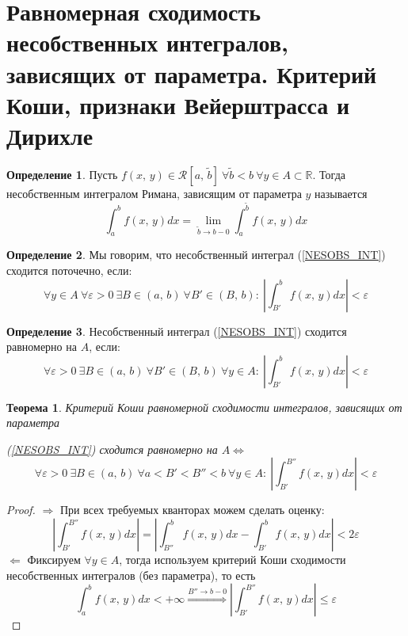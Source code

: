 \documentclass[a4paper,12pt]{article}
\renewcommand{\leq}{\ensuremath{\leqslant}}
\theoremstyle{plain}
\newtheorem{theorem}{Теорема}[section]
\theoremstyle{definition}
\newtheorem{definition}{Определение}[section]
\theoremstyle{remark}
\begin{document}
\section{Равномерная сходимость несобственных интегралов, зависящих от параметра. Критерий Коши, признаки Вейерштрасса и Дирихле}
\begin{definition}
	Пусть $f(x,\,y) \in \mathcal{R}[a,\,\tilde{b}] \: \forall \tilde{b} < b \: \forall y \in A \subset \mathbb{R}$. Тогда несобственным интегралом Римана, зависящим от параметра $y$ называется
	\begin{equation} \label{NESOBS_INT}
		\int_a^b f(x,\,y)dx = \lim_{\tilde{b} \to b - 0} \int_a^{\tilde{b}}f(x,\,y)dx
	\end{equation}
\end{definition}

\begin{definition}
	Мы говорим, что несобственный интеграл (\ref{NESOBS_INT}) сходится поточечно, если:
	\[\forall y \in A \: \forall \varepsilon > 0 \: \exists B \in (a,\,b) \: \forall B' \in (B,\,b):\: \left|\int_{B'}^b f(x,\,y)dx\right| < \varepsilon\]
\end{definition}

\begin{definition}
	Несобственный интеграл (\ref{NESOBS_INT}) сходится равномерно на $A$, если:
	\[\forall \varepsilon > 0 \: \exists B \in (a,\,b) \: \forall B' \in (B,\,b) \: \forall y \in A :\: \left|\int_{B'}^b f(x,\,y)dx\right| < \varepsilon\]
\end{definition}

\begin{theorem}
	Критерий Коши равномерной сходимости интегралов, зависящих от параметра

	(\ref{NESOBS_INT}) сходится равномерно на $A \Leftrightarrow$
	\[\forall \varepsilon > 0 \: \exists B \in (a,\,b) \: \forall a < B' < B''< b \: \forall y \in A :\: \left|\int_{B'}^{B''}f(x,\,y)dx\right| < \varepsilon\]
\end{theorem}

\begin{proof}
	$\Rightarrow$ При всех требуемых кванторах можем сделать оценку:
	\[\left|\int_{B'}^{B''}f(x,\,y)dx\right| = \left|\int_{B''}^b f(x,\,y)dx - \int_{B'}^bf(x,\,y)dx\right| < 2\varepsilon\]
	$\Leftarrow$ Фиксируем $\forall y \in A$, тогда используем критерий Коши сходимости несобственных интегралов (без параметра), то есть
	\[\int_a^b f(x,\,y)dx < +\infty \stackrel{B'' \to b - 0}{\Rightarrow} \left|\int_{B'}^{B''}f(x,\,y)dx\right| \leq \varepsilon\]
\end{proof}
\end{document}
